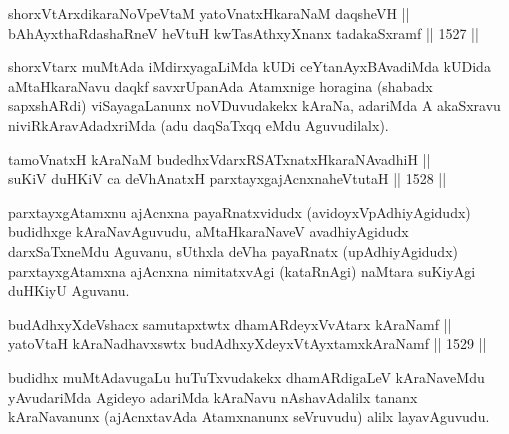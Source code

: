 
\begin{shl}
shorxVtArxdikaraNoVpeVtaM yatoV\s natxHkaraNaM daqsheVH || \\
bAhAyxthaRdashaRneV heVtuH kwTasAthxyXnanx tadakaSxramf ||  1527 ||  
\end{shl}

\begin{artha}
shorxVtarx muMtAda iMdirxyagaLiMda kUDi ceYtanAyxBAvadiMda kUDida aMtaHkaraNavu daqkf savxrUpanAda Atamxnige horagina (shabadx sapxshARdi) viSayagaLanunx noVDuvudakekx kAraNa, adariMda A akaSxravu niviRkAravAdadxriMda (adu daqSaTxqq eMdu Aguvudilalx).
\end{artha}


\begin{shl}
tamoVnatxH kAraNaM budedhxVdarxRSATx\s natxHkaraNAvadhiH ||  \\
suKiV duHKiV ca deVhAnatxH parxtayxgajAcnxnaheVtutaH ||  1528 ||  
\end{shl}

\begin{artha}
parxtayxgAtamxnu ajAcnxna payaRnatxvidudx (avidoyxVpAdhiyAgidudx) budidhxge kAraNavAguvudu, aMtaHkaraNaveV avadhiyAgidudx darxSaTxneMdu Aguvanu, sUthxla deVha payaRnatx (upAdhiyAgidudx) parxtayxgAtamxna ajAcnxna nimitatxvAgi (kataRnAgi) naMtara suKiyAgi duHKiyU Aguvanu.
\end{artha}


\begin{shl}
budAdhxyXdeVshacx samutapxtwtx dhamARdeyxVvAtarx kAraNamf || \\
yatoV\s taH kAraNadhavxswtx budAdhxyXdeyxVtAyxtamxkAraNamf ||  1529 ||  
\end{shl}

\begin{artha}
budidhx muMtAdavugaLu huTuTxvudakekx dhamARdigaLeV kAraNaveMdu yAvudariMda Agideyo adariMda kAraNavu nAshavAdalilx tananx kAraNavanunx (ajAcnxtavAda Atamxnanunx seVruvudu) alilx layavAguvudu.
\end{artha}


